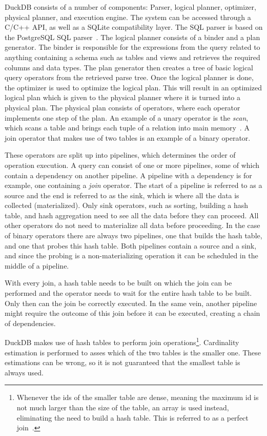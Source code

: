DuckDB consists of a number of components: Parser, logical planner, optimizer, physical planner, and execution engine. 
The system can be accessed through a C/C++ API, as well as a SQLite compatibility layer. 
The SQL parser is based on the PostgreSQL SQL parser~\cite{DBLP:conf/sigmod/RaasveldtM19}.
The logical planner consists of a binder and a plan generator.
The binder is responsible for the expressions from the query related to anything containing a schema such as tables and views and retrieves the required columns and data types. 
The plan generator then creates a tree of basic logical query operators from the retrieved parse tree. 
Once the logical planner is done, the optimizer is used to optimize the logical plan. 
This will result in an optimized logical plan which is given to the physical planner where it is turned into a physical plan.
The physical plan consists of operators, where each operator implements one step of the plan. 
An example of a unary operator is the \textit{scan}, which scans a table and brings each tuple of a relation into main memory~\cite{DBLP:books/daglib/0020812}.
A join operator that makes use of two tables is an example of a binary operator.

These operators are split up into pipelines, which determines the order of operation execution.
A query can consist of one or more pipelines, some of which contain a dependency on another pipeline. 
A pipeline with a dependency is for example, one containing a \textit{join} operator. 
The start of a pipeline is referred to as a source and the end is referred to as the sink, which is where all the data is collected (materialized).
Only sink operators, such as sorting, building a hash table, and hash aggregation need to see all the data before they can proceed. All other operators do not need to materialize all data before proceeding. 
In the case of binary operators there are always two pipelines, one that builds the hash table, and one that probes this hash table. Both pipelines contain a source and a sink, and since the probing is a non-materializing operation it can be scheduled in the middle of a pipeline. 

With every join, a hash table needs to be built on which the join can be performed and the operator needs to wait for the entire hash table to be built.  
Only then can the join be correctly executed.
In the same vein, another pipeline might require the outcome of this join before it can be executed, creating a chain of dependencies.

DuckDB makes use of hash tables to perform join operations\footnote{Whenever the ids of the smaller table are dense, meaning the maximum id is not much larger than the size of the table, an array is used instead, eliminating the need to build a hash table. This is referred to as a perfect join~\cite{DBLP:conf/sigmod/AbadiMH08}.}. 
Cardinality estimation is performed to asses which of the two tables is the smaller one. These estimations can be wrong, so it is not guaranteed that the smallest table is always used. 



